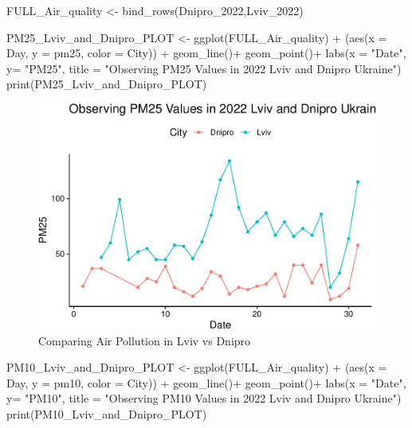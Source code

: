 \documentclass[
  12pt,
]{article}
\newenvironment{Shaded}{\begin{snugshade}}{\end{snugshade}}
\newcommand{\AttributeTok}[1]{\textcolor[rgb]{0.77,0.63,0.00}{#1}}
\newcommand{\FunctionTok}[1]{\textcolor[rgb]{0.00,0.00,0.00}{#1}}
\newcommand{\NormalTok}[1]{#1}
\newcommand{\OtherTok}[1]{\textcolor[rgb]{0.56,0.35,0.01}{#1}}
\newcommand{\SpecialCharTok}[1]{\textcolor[rgb]{0.00,0.00,0.00}{#1}}
\newcommand{\StringTok}[1]{\textcolor[rgb]{0.31,0.60,0.02}{#1}}
\begin{document}
\begin{Shaded}
\begin{Highlighting}[]
\NormalTok{FULL\_Air\_quality }\OtherTok{\textless{}{-}} \FunctionTok{bind\_rows}\NormalTok{(Dnipro\_2022,Lviv\_2022)}

\NormalTok{PM25\_Lviv\_and\_Dnipro\_PLOT }\OtherTok{\textless{}{-}}
  \FunctionTok{ggplot}\NormalTok{(FULL\_Air\_quality) }\SpecialCharTok{+} 
\NormalTok{(}\FunctionTok{aes}\NormalTok{(}\AttributeTok{x =}\NormalTok{ Day, }\AttributeTok{y =}\NormalTok{ pm25, }\AttributeTok{color =}\NormalTok{ City)) }\SpecialCharTok{+} 
              \FunctionTok{geom\_line}\NormalTok{()}\SpecialCharTok{+}  
  \FunctionTok{geom\_point}\NormalTok{()}\SpecialCharTok{+}
  \FunctionTok{labs}\NormalTok{(}\AttributeTok{x =} \StringTok{"Date"}\NormalTok{, }\AttributeTok{y=} \StringTok{"PM25"}\NormalTok{,}
       \AttributeTok{title =} \StringTok{"Observing PM25 Values in 2022 Lviv and Dnipro Ukraine"}\NormalTok{)  }
\FunctionTok{print}\NormalTok{(PM25\_Lviv\_and\_Dnipro\_PLOT)}
\end{Highlighting}
\end{Shaded}

\begin{figure}
\centering
\includegraphics{Fontanie_Gordon_Weinberg_Project_files/figure-latex/Plotting Lviv vs Dnipro-1.pdf}
\caption{Comparing Air Pollution in Lviv vs Dnipro}
\end{figure}

\begin{Shaded}
\begin{Highlighting}[]
\NormalTok{PM10\_Lviv\_and\_Dnipro\_PLOT }\OtherTok{\textless{}{-}}
  \FunctionTok{ggplot}\NormalTok{(FULL\_Air\_quality) }\SpecialCharTok{+} 
\NormalTok{(}\FunctionTok{aes}\NormalTok{(}\AttributeTok{x =}\NormalTok{ Day, }\AttributeTok{y =}\NormalTok{ pm10, }\AttributeTok{color =}\NormalTok{ City)) }\SpecialCharTok{+} 
              \FunctionTok{geom\_line}\NormalTok{()}\SpecialCharTok{+}  
  \FunctionTok{geom\_point}\NormalTok{()}\SpecialCharTok{+}
  \FunctionTok{labs}\NormalTok{(}\AttributeTok{x =} \StringTok{"Date"}\NormalTok{, }\AttributeTok{y=} \StringTok{"PM10"}\NormalTok{,}
       \AttributeTok{title =} \StringTok{"Observing PM10 Values in 2022 Lviv and Dnipro Ukraine"}\NormalTok{)  }
\FunctionTok{print}\NormalTok{(PM10\_Lviv\_and\_Dnipro\_PLOT)}
\end{Highlighting}
\end{Shaded}
\end{document}
